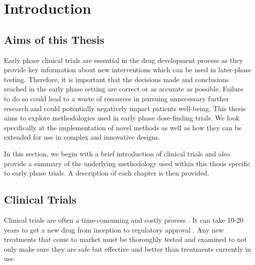 
\chapter{Introduction} %

\label{Intro} %

\section{Aims of this Thesis}
Early phase clinical trials are essential in the drug development process as they provide key information about new interventions which can be used in later-phase testing. Therefore, it is important that the decisions made and conclusions reached in the early phase setting are correct or as accurate as possible. Failure to do so could lead to a waste of resources in pursuing unnecessary further research and could potentially negatively impact patients well-being. This thesis aims to explore methodologies used in early phase dose-finding trials. We look specifically at the implementation of novel methods as well as how they can be extended for use in complex and innovative designs. 

In this section, we begin with a brief introduction of clinical trials and also provide a summary of the underlying methodology used within this thesis specific to early phase trials. A description of each chapter is then provided. 

\section{Clinical Trials}

Clinical trials are often a time-consuming and costly process \cite{fogelFactorsAssociatedClinical2018}. It can take 10-20 years to get a new drug from inception to regulatory approval \cite{lipskyIdeaMarketDrug2001, mohsDrugDiscoveryDevelopment2017}. Any new treatments that come to market must be thoroughly tested and examined to not only make sure they are safe but effective and better than treatments currently in use.

